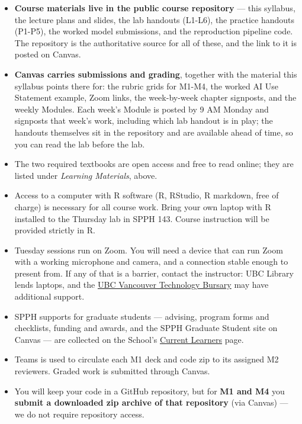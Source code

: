 \documentclass[
]{article}
\providecommand{\tightlist}{%
  \setlength{\itemsep}{0pt}\setlength{\parskip}{0pt}}
\begin{document}
\begin{itemize}
\tightlist
\item
  \textbf{Course materials live in the public course repository} ---
  this syllabus, the lecture plans and slides, the lab handouts (L1-L6),
  the practice handouts (P1-P5), the worked model submissions, and the
  reproduction pipeline code. The repository is the authoritative source
  for all of these, and the link to it is posted on Canvas.
\item
  \textbf{Canvas carries submissions and grading}, together with the
  material this syllabus points there for: the rubric grids for M1-M4,
  the worked AI Use Statement example, Zoom links, the week-by-week
  chapter signposts, and the weekly Modules. Each week's Module is
  posted by 9 AM Monday and signposts that week's work, including which
  lab handout is in play; the handouts themselves sit in the repository
  and are available ahead of time, so you can read the lab before the
  lab.
\item
  The two required textbooks are open access and free to read online;
  they are listed under \emph{Learning Materials}, above.
\item
  Access to a computer with R software (R, RStudio, R markdown, free of
  charge) is necessary for all course work. Bring your own laptop with R
  installed to the Thursday lab in SPPH 143. Course instruction will be
  provided strictly in R.
\item
  Tuesday sessions run on Zoom. You will need a device that can run Zoom
  with a working microphone and camera, and a connection stable enough
  to present from. If any of that is a barrier, contact the instructor:
  UBC Library lends laptops, and the
  \href{https://students.ubc.ca/finances/awards-scholarships-bursaries/ubc-vancouver-technology-bursary/}{UBC
  Vancouver Technology Bursary} may have additional support.
\item
  SPPH supports for graduate students --- advising, program forms and
  checklists, funding and awards, and the SPPH Graduate Student site on
  Canvas --- are collected on the School's
  \href{https://spph.ubc.ca/current-learners/}{Current Learners} page.
\item
  Teams is used to circulate each M1 deck and code zip to its assigned
  M2 reviewers. Graded work is submitted through Canvas.
\item
  You will keep your code in a GitHub repository, but for \textbf{M1 and
  M4} you \textbf{submit a downloaded zip archive of that repository}
  (via Canvas) --- we do not require repository access.
\end{itemize}
\end{document}
